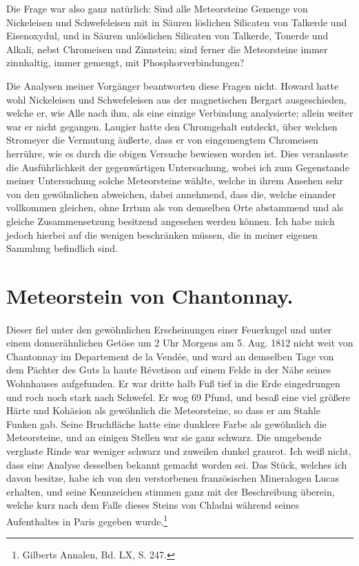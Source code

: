 \documentclass[a4paper, 11pt, oneside]{article}
\begin{document}
Die Frage war also ganz natürlich: Sind alle Meteorsteine Gemenge von Nickeleisen und Schwefeleisen mit in Säuren löslichen Silicaten von Talkerde und Eisenoxydul, und in Säuren unlöslichen Silicaten von Talkerde, Tonerde und Alkali, nebst Chromeisen und Zinnstein; sind ferner die Meteorsteine immer zinnhaltig, immer gemengt, mit Phosphorverbindungen?

Die Analysen meiner Vorgänger beantworten diese Fragen nicht. Howard hatte wohl Nickeleisen und Schwefeleisen aus der magnetischen Bergart ausgeschieden, welche er, wie Alle nach ihm, als eine einzige Verbindung analysierte; allein weiter war er nicht gegangen. Laugier hatte den Chromgehalt entdeckt, über welchen Stromeyer die Vermutung äußerte, dass er von eingemengtem Chromeisen herrühre, wie es durch die obigen Versuche bewiesen worden ist. Dies veranlasste die Ausführlichkeit der gegenwärtigen Untersuchung, wobei ich zum Gegenstande meiner Untersuchung solche Meteorsteine wählte, welche in ihrem Ansehen sehr von den gewöhnlichen abweichen, dabei annehmend, dass die, welche einander vollkommen gleichen, ohne Irrtum als von demselben Orte abstammend und als gleiche Zusammensetzung besitzend angesehen werden können. Ich habe mich jedoch hierbei auf die wenigen beschränken müssen, die in meiner eigenen Sammlung befindlich sind.

\section{Meteorstein von Chantonnay.}
\paragraph{}
Dieser fiel unter den gewöhnlichen Erscheinungen einer Feuerkugel und unter einem donnerähnlichen Getöse um 2 Uhr Morgens am 5. Aug. 1812 nicht weit von Chantonnay im Departement de la Vendée, und ward an demselben Tage von dem Pächter des Guts la haute Révetison auf einem Felde in der Nähe seines Wohnhauses aufgefunden. Er war dritte halb Fuß tief in die Erde eingedrungen und roch noch stark nach Schwefel. Er wog 69 Pfund, und besaß eine viel größere Härte und Kohäsion als gewöhnlich die Meteorsteine, so dass er am Stahle Funken gab. Seine Bruchfläche hatte eine dunklere Farbe als gewöhnlich die Meteorsteine, und an einigen Stellen war sie ganz schwarz. Die umgebende verglaste Rinde war weniger schwarz und zuweilen dunkel graurot. Ich weiß nicht, dass eine Analyse desselben bekannt gemacht worden sei. Das Stück, welches ich davon besitze, habe ich von den verstorbenen französischen Mineralogen Lucas erhalten, und seine Kennzeichen stimmen ganz mit der Beschreibung überein, welche kurz nach dem Falle dieses Steins von Chladni während seines Aufenthaltes in Paris gegeben wurde.\footnote{Gilberts Annalen, Bd. LX, S. 247.}
\end{document}

